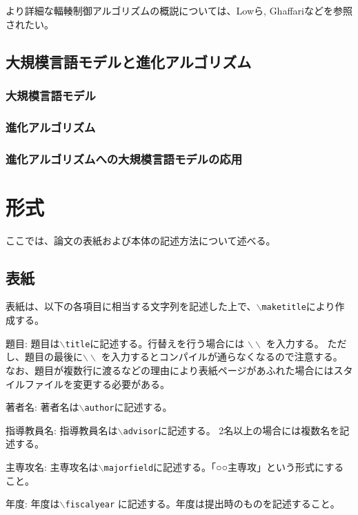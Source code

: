 \documentclass[a4paper,11pt]{jreport}
\begin{document}
より詳細な輻輳制御アルゴリズムの概説については、Lowら\cite{980245}, Ghaffari\cite{GHAFFARI2015101}などを参照されたい。

\section{大規模言語モデルと進化アルゴリズム}

\subsection{大規模言語モデル}

\subsection{進化アルゴリズム}

\subsection{進化アルゴリズムへの大規模言語モデルの応用}

\newpage

\chapter{形式}

ここでは、論文の表紙および本体の記述方法について述べる。

\section{表紙}

表紙は、以下の各項目に相当する文字列を記述した上で、\texttt{$\backslash$maketitle}により作成する。

\begin{description} \parskip=1pt
\item{題目: }
題目は\texttt{$\backslash$title}に記述する。行替えを行う場合には $\backslash \backslash$ を入力する。
ただし、題目の最後に$\backslash \backslash$ を入力するとコンパイルが通らなくなるので注意する。
なお、題目が複数行に渡るなどの理由により表紙ページがあふれた場合にはスタイルファイルを変更する必要がある。
\item{著者名: }
著者名は\texttt{$\backslash$author}に記述する。
\item{指導教員名: }
指導教員名は\texttt{$\backslash$advisor}に記述する。
2名以上の場合には複数名を記述する。
\item{主専攻名: }
主専攻名は\texttt{$\backslash$majorfield}に記述する。「○○主専攻」という形式にすること。
\item{年度: }
年度は\texttt{$\backslash$fiscalyear} に記述する。年度は提出時のものを記述すること。
\end{description}
\end{document}
